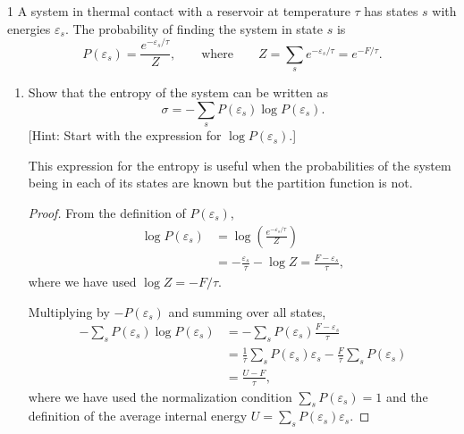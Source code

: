 \documentclass[11pt]{article}
\begin{document}
\begin{problem}{1}
A system in thermal contact with a reservoir at temperature \( \tau \) has states \( s \) with energies \( \varepsilon_s \).
The probability of finding the system in state \( s \) is
\begin{equation}
  \label{eq:p1-state-probability}
  P(\varepsilon_s) = \frac{e^{-\varepsilon_s/\tau}}{Z},
  \qquad \text{where} \qquad Z = \sum_s e^{-\varepsilon_s/\tau} = e^{-F/\tau}.
\end{equation}
\begin{enumerate}[label=(\alph*)]
  \item Show that the entropy of the system can be written as
  \begin{equation}
    \label{eq:p1-gibbs-entropy}
    \sigma = -\sum_s P(\varepsilon_s)\log P(\varepsilon_s).
  \end{equation}
  [Hint: Start with the expression for \( \log P(\varepsilon_s) \).]

  This expression for the entropy is useful when the probabilities of the system being in each of its states are known but the partition function is not.
        \begin{proof}
    From the definition of \( P(\varepsilon_{s}) \),
    \begin{equation}
        \label{eq:p1-log-probability}
        \begin{aligned}
            \log P(\varepsilon_s)
            &= \log\left(\frac{e^{-\varepsilon_s/\tau}}{Z}\right)\\
            &= -\frac{\varepsilon_s}{\tau} - \log Z = \frac{F-\varepsilon_s}{\tau},
        \end{aligned}
    \end{equation}
    where we have used \( \log Z = -F/\tau \).

    Multiplying by \( -P(\varepsilon_s) \) and summing over all states,
    \begin{equation}
        \label{eq:p1-entropy-sum}
        \begin{aligned}
            -\sum_s P(\varepsilon_s)\log P(\varepsilon_s)
            &= -\sum_s P(\varepsilon_s)\frac{F-\varepsilon_s}{\tau}\\
            &= \frac{1}{\tau}\sum_s P(\varepsilon_s)\varepsilon_s
            - \frac{F}{\tau}\sum_s P(\varepsilon_s)\\
            &= \frac{U-F}{\tau},
        \end{aligned}
    \end{equation}
    where we have used the normalization condition
    \( \sum_s P(\varepsilon_s)=1 \) and the definition of the
    average internal energy
    \( U=\sum_s P(\varepsilon_s)\varepsilon_s \).


\end{proof}
\end{enumerate}
\end{problem}
\end{document}
